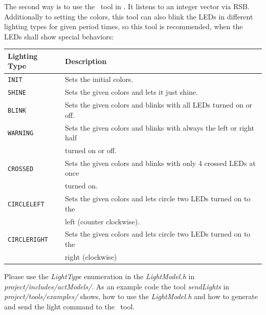 \bigskip

The second way is to use the \setlightsnameI\ tool in \setlightspathI. It listens to an integer vector via RSB. Additionally to setting the colors, this tool can also blink the LEDs in different lighting types for given period times, so this tool is recommended, when the LEDs shall show special behaviors:

\medskip

\begin{tabular}{l|l}
{\bf Lighting Type} & {\bf Description} \\
\hline
{\tt INIT}        & Sets the initial colors. \\
\hline
{\tt SHINE}       & Sets the given colors and lets it just shine. \\
\hline
{\tt BLINK}       & Sets the given colors and blinks with all LEDs turned on or off. \\
\hline
{\tt WARNING}     & Sets the given colors and blinks with always the left or right half \\
                  & turned on or off. \\
\hline
{\tt CROSSED}     & Sets the given colors and blinks with only 4 crossed LEDs at once \\
                  & turned on. \\
\hline
{\tt CIRCLELEFT}  & Sets the given colors and lets circle two LEDs turned on to the \\
                  & left (counter clockwise). \\
\hline
{\tt CIRCLERIGHT} & Sets the given colors and lets circle two LEDs turned on to the \\
                  & right (clockwise) \\
\end{tabular}

\bigskip

Please use the {\it LightType} enumeration in the {\it LightModel.h} in {\it project/includes/actModels/}. As an example code the tool {\it sendLights} in {\it project/tools/examples/} shows, how to use the {\it LightModel.h} and how to generate and send the light command to the \setlightsnameI\ tool.

